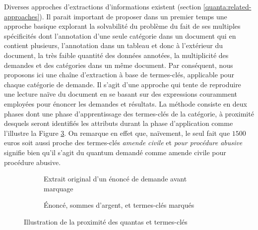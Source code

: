 Diverses approches d'extractions d'informations existent (section \ref{quanta:related-approaches}). Il parait important de proposer dans un premier temps une approche basique explorant la solvabilité du problème du fait de ses multiples spécificités dont l'annotation d'une seule catégorie dans un document qui en contient plusieurs, l'annotation dans un tableau et donc à l'extérieur du document, la très faible quantité des données annotées, la multiplicité des demandes et des catégories dans un même document. Par conséquent, nous proposons ici une chaîne d'extraction à base de termes-clés, applicable pour chaque catégorie de demande. Il s'agit d'une approche qui tente de reproduire une lecture naïve du document en se basant sur des expressions couramment employées pour énoncer les demandes et résultats. La méthode consiste en deux phases dont une phase d'apprentissage des termes-clés de la catégorie, à proximité desquels seront identifiés les attributs durant la phase d'application comme l'illustre la Figure \ref{fig:quanta:exemple-proximite}. On remarque en effet que, naïvement, le seul fait que $1500$ euros soit aussi proche des termes-clés \textit{amende civile} et \textit{pour procédure abusive} signifie bien qu'il s'agit du quantum demandé comme amende civile pour procédure abusive.

\begin{figure}[!htb]
	\scriptsize
	\centering
	\begin{subfigure}[t]{0.95\textwidth}
		\caption{Extrait original d'un énoncé de demande avant marquage}\label{fig:quanta:exemple-proximite-original}
	\end{subfigure} 
	
	
	\begin{subfigure}[t]{0.95\textwidth}
		\caption{Énoncé, sommes d'argent, et termes-clés marqués}\label{fig:quanta:exemple-proximite-marquage}
	\end{subfigure}
	\caption{Illustration de la proximité des quantas et termes-clés}
	\label{fig:quanta:exemple-proximite}
\end{figure} 

